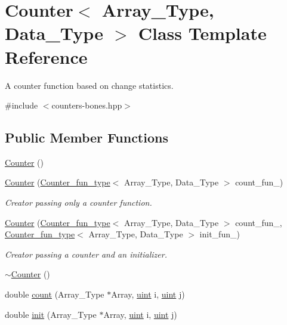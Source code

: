 \hypertarget{class_counter}{}\section{Counter$<$ Array\+\_\+\+Type, Data\+\_\+\+Type $>$ Class Template Reference}
\label{class_counter}


A counter function based on change statistics.  




{\ttfamily \#include $<$counters-\/bones.\+hpp$>$}

\subsection*{Public Member Functions}
\begin{DoxyCompactItemize}
\item 
\hyperlink{class_counter_a56c2f4ad875497dea97934cd3ddebc81}{Counter} ()
\item 
\hyperlink{class_counter_a1cb9cb17062f8785fcb4c4babd932d68}{Counter} (\hyperlink{typedefs_8hpp_ac0160f52f564dea3ac033b374cffbfe7}{Counter\+\_\+fun\+\_\+type}$<$ Array\+\_\+\+Type, Data\+\_\+\+Type $>$ count\+\_\+fun\+\_\+)
\begin{DoxyCompactList}\small\item\em Creator passing only a counter function. \end{DoxyCompactList}\item 
\hyperlink{class_counter_a6085b2ef220e2706c9558001f76125bd}{Counter} (\hyperlink{typedefs_8hpp_ac0160f52f564dea3ac033b374cffbfe7}{Counter\+\_\+fun\+\_\+type}$<$ Array\+\_\+\+Type, Data\+\_\+\+Type $>$ count\+\_\+fun\+\_\+, \hyperlink{typedefs_8hpp_ac0160f52f564dea3ac033b374cffbfe7}{Counter\+\_\+fun\+\_\+type}$<$ Array\+\_\+\+Type, Data\+\_\+\+Type $>$ init\+\_\+fun\+\_\+)
\begin{DoxyCompactList}\small\item\em Creator passing a counter and an initializer. \end{DoxyCompactList}\item 
\hyperlink{class_counter_a66594b4ffbbf337241b032c1f039b3c0}{$\sim$\+Counter} ()
\item 
double \hyperlink{class_counter_afe1d23e72c3bdca9b2481f36ebde1d95}{count} (Array\+\_\+\+Type $\ast$Array, \hyperlink{typedefs_8hpp_a91ad9478d81a7aaf2593e8d9c3d06a14}{uint} i, \hyperlink{typedefs_8hpp_a91ad9478d81a7aaf2593e8d9c3d06a14}{uint} j)
\item 
double \hyperlink{class_counter_ae0451979ddc51a5fbf00de78c37d3216}{init} (Array\+\_\+\+Type $\ast$Array, \hyperlink{typedefs_8hpp_a91ad9478d81a7aaf2593e8d9c3d06a14}{uint} i, \hyperlink{typedefs_8hpp_a91ad9478d81a7aaf2593e8d9c3d06a14}{uint} j)
\end{DoxyCompactItemize}
